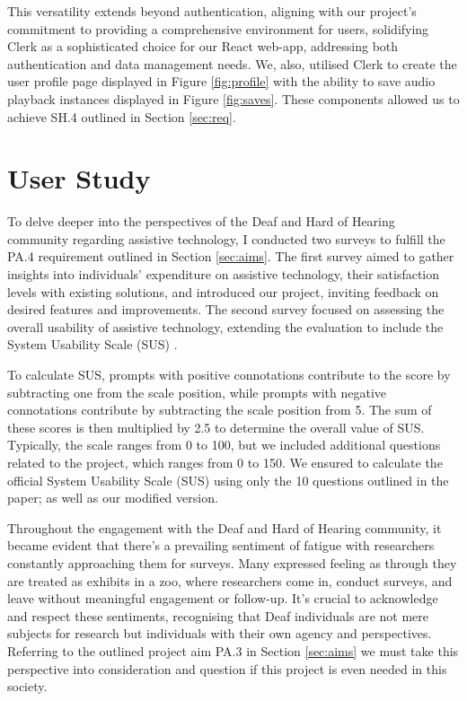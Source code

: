\documentclass{l4proj}
\begin{document}
This versatility extends beyond authentication, aligning with our project's commitment to providing a comprehensive environment for users, solidifying Clerk as a sophisticated choice for our React web-app, addressing both authentication and data management needs. We, also, utilised Clerk to create the user profile page displayed in Figure \ref{fig:profile} with the ability to save audio playback instances displayed in Figure \ref{fig:saves}. These components allowed us to achieve SH.4 outlined in Section \ref{sec:req}.

\chapter{User Study}
\label{sec:user-study}

To delve deeper into the perspectives of the Deaf and Hard of Hearing community regarding assistive technology, I conducted two surveys to fulfill the PA.4 requirement outlined in Section \ref{sec:aims}. The first survey aimed to gather insights into individuals' expenditure on assistive technology, their satisfaction levels with existing solutions, and introduced our project, inviting feedback on desired features and improvements. The second survey focused on assessing the overall usability of assistive technology, extending the evaluation to include the System Usability Scale (SUS) \cite{SUS}. 

To calculate SUS, prompts with positive connotations contribute to the score by subtracting one from the scale position, while prompts with negative connotations contribute by subtracting the scale position from 5. The sum of these scores is then multiplied by 2.5 to determine the overall value of SUS. Typically, the scale ranges from 0 to 100, but we included additional questions related to the project, which ranges from 0 to 150. We ensured to calculate the official System Usability Scale (SUS) using only the 10 questions outlined in the paper; as well as our modified version.

Throughout the engagement with the Deaf and Hard of Hearing community, it became evident that there's a prevailing sentiment of fatigue with researchers constantly approaching them for surveys. Many expressed feeling as through they are treated as exhibits in a zoo, where researchers come in, conduct surveys, and leave without meaningful engagement or follow-up. It's crucial to acknowledge and respect these sentiments, recognising that Deaf individuals are not mere subjects for research but individuals with their own agency and perspectives. Referring to the outlined project aim PA.3 in Section \ref{sec:aims} we must take this perspective into consideration and question if this project is even needed in this society.
\end{document}
